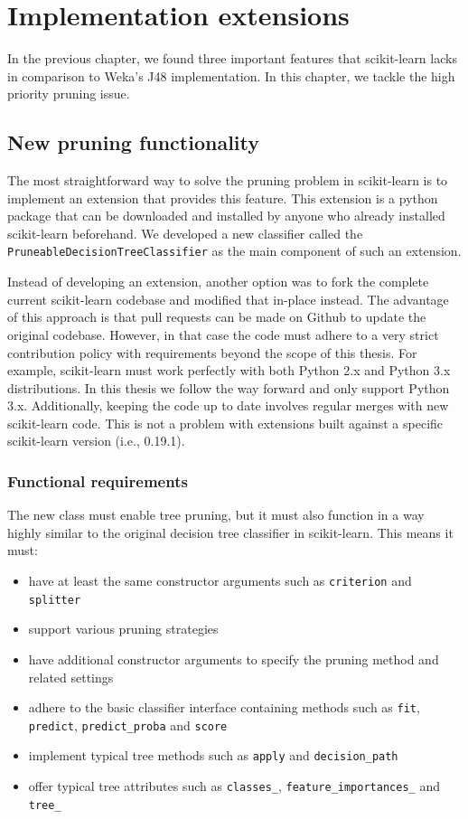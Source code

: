 \chapter{Implementation extensions}\label{cha:software_new}
In the previous chapter, we found three important features that scikit-learn lacks in comparison to Weka's J48 implementation. In this chapter, we tackle the high priority pruning issue.

\section{New pruning functionality}
The most straightforward way to solve the pruning problem in scikit-learn is to implement an extension that provides this feature. This extension is a python package that can be downloaded and installed by anyone who already installed scikit-learn beforehand. We developed a new classifier called the \texttt{PruneableDecisionTreeClassifier} as the main component of such an extension. 

Instead of developing an extension, another option was to fork the complete current scikit-learn codebase and modified that in-place instead. The advantage of this approach is that pull requests can be made on Github to update the original codebase. However, in that case the code must adhere to a very strict contribution policy with requirements beyond the scope of this thesis. For example, scikit-learn must work perfectly with both Python 2.x and Python 3.x distributions. In this thesis we follow the way forward and only support Python 3.x. Additionally, keeping the code up to date involves regular merges with new scikit-learn code. This is not a problem with extensions built against a specific scikit-learn version (i.e., 0.19.1).

\subsection{Functional requirements}
The new class must enable tree pruning, but it must also function in a way highly similar to the original decision tree classifier in scikit-learn. This means it must:
\begin{itemize}
    \item have at least the same constructor arguments such as \texttt{criterion} and \texttt{splitter}
    \item support various pruning strategies
    \item have additional constructor arguments to specify the pruning method and related settings
    \item adhere to the basic classifier interface containing methods such as \texttt{fit}, \texttt{predict}, \texttt{predict\_proba} and \texttt{score}
    \item implement typical tree methods such as \texttt{apply} and \texttt{decision\_path}
    \item offer typical tree attributes such as \texttt{classes\_}, \texttt{feature\_importances\_} and \texttt{tree\_}
\end{itemize}

